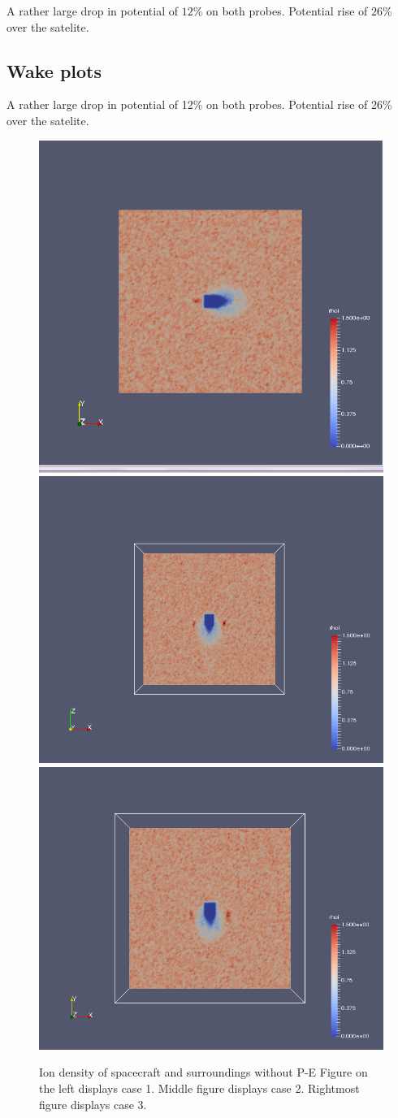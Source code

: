 A rather large drop in potential of \( 12\)\% on both probes. Potential rise of \(26\)\% over the satelite.

\subsection{Wake plots}

A rather large drop in potential of 12\% on both probes. Potential rise of 26\% over the satelite.

    \begin{figure}
        \includegraphics[width = 0.3 \textwidth]{images/ion_density_case1}
        \includegraphics[width = 0.3 \textwidth]{images/ion_density_x-z_case2}
	\includegraphics[width = 0.3 \textwidth]{images/ion_density_x-y_case3}
        \caption{Ion density of spacecraft and surroundings without P-E Figure on the left displays case 1. Middle figure displays case 2. Rightmost figure displays case 3.}
    \end{figure}
